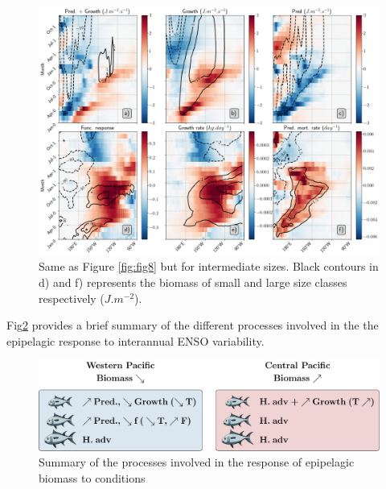 
\begin{figure}[h!tp]
	\centering
	\includegraphics[scale=0.4]{figs/fig9.png}	
	\caption{Same as Figure \ref{fig:fig8} but for intermediate sizes. Black contours in d) and f) represents the biomass of small and large size classes respectively ($J.m^{-2}$).}
	\label{fig:fig9}
\end{figure}

Fig\ref{fig:proc_summary} provides a brief summary of the different processes involved in the the epipelagic response to interannual ENSO variability.

\begin{figure}[h!tp]
	\centering
        \includegraphics[scale=0.6]{figs/conclusion/conlusion_fig.pdf}	
        \caption{Summary of the processes involved in the response of epipelagic biomass to \nino{} conditions}
	\label{fig:proc_summary}
\end{figure}



